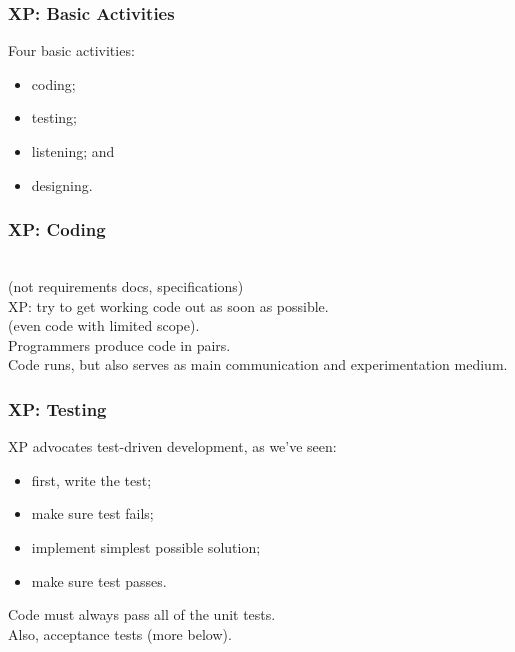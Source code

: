 \begin{frame}
\frametitle{XP: Basic Activities}
\begin{changemargin}{2cm}
\Large
Four basic activities: 
\begin{itemize}
\item coding;
\item testing;
\item listening; and
\item designing.
\end{itemize}
\end{changemargin}
\end{frame}

\begin{frame}
\frametitle{XP: Coding}
\begin{changemargin}{2cm}

\\
(not requirements docs, specifications)\\[1em]

XP: try to get working code out as soon as possible.\\
(even code with limited scope).\\[1em]

Programmers produce code in pairs.\\[1em]

Code runs, but also serves as main communication and experimentation medium.
\end{changemargin}
\end{frame}

\begin{frame}
\frametitle{XP: Testing}
\begin{changemargin}{2cm}

XP advocates test-driven development, as we've seen: \\
\begin{itemize}
\item first, write the test;
\item make sure test fails;
\item implement simplest possible solution;
\item make sure test passes.
\end{itemize}

Code must always pass all of the unit tests.\\[1em]

Also, acceptance tests (more below).
\end{changemargin}
\end{frame}


